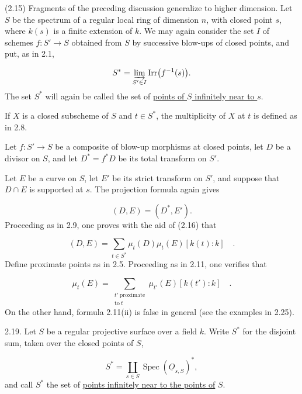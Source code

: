 (2.15) Fragments of the preceding discussion generalize to higher dimension.  Let
$S$ be the spectrum of a regular local ring of dimension $n$, with closed point
$s$, where $k(s)$ is a finite extension of $k$.  We may again consider the set
$I$ of schemes $f:S'\longrightarrow S$ obtained from $S$ by successive blow-ups
of closed points, and put, as in 2.1,

\begin{equation*}
S^*=\varinjlim_{S'\in I}\operatorname{Irr}\bigl(f^{-1}(s)\bigr).
\end{equation*}
The set $S^*$ will again be called the set of \underline{points of $S$
infinitely near to $s$}.

If $X$ is a closed subscheme of $S$ and $t\in S^*$, the multiplicity of $X$ at
$t$ is defined as in 2.8.

Let $f:S'\longrightarrow S$ be a composite of blow-up morphisms at closed
points, let $D$ be a divisor on $S$, and let $D^*=f^*D$ be its total transform
on $S'$.


Let $E$ be a curve on $S$, let $E'$ be its strict transform on $S'$, and suppose
that $D\cap E$ is supported at $s$.  The projection formula again gives

\begin{equation}\tag{2.16}
(D,E)=(D^*,E').
\end{equation}
Proceeding as in 2.9, one proves with the aid of (2.16) that

\begin{equation}\tag{2.17}
(D,E)=\sum_{t\in S^*}\mu_t(D)\mu_t(E)[k(t):k] \quad .
\end{equation}
Define proximate points as in 2.5.  Proceeding as in 2.11, one verifies that

\begin{equation}\tag{2.18}
\mu_t(E)=
\sum_{\substack{t'\ \mathrm{proximate}\\\mathrm{to}\ t}}
\mu_{t'}(E)[k(t'):k] \quad .
\end{equation}
On the other hand, formula 2.11(ii) is false in general (see the examples in
2.25).

2.19. Let $S$ be a regular projective surface over a field $k$.  Write $S^*$
for the disjoint sum, taken over the closed points of $S$,

\begin{equation*}
S^*=\coprod_{s\in S}\operatorname{Spec}(\underline{O}_{s,S})^*,
\end{equation*}
and call $S^*$ the set of \underline{points infinitely near to the points of}
$S$.

